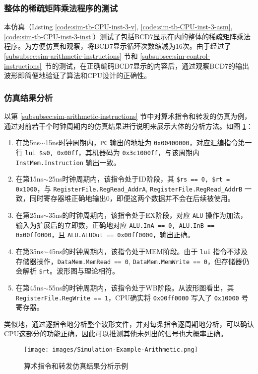 \subsubsection{整体的稀疏矩阵乘法程序的测试}
本仿真（Listing \ref{code:sim-tb-CPU-inst-3-v}, \ref{code:sim-tb-CPU-inst-3-asm}, \ref{code:sim-tb-CPU-inst-3-inst}）测试了包括BCD7显示在内的整体的稀疏矩阵乘法程序。为方便仿真和观察，将BCD7显示循环次数缩减为16次。由于经过了 \ref{subsubsec:sim-arithmetic-instructions} 节和 \ref{subsubsec:sim-control-instructions}\ 节的测试，在正确编码BCD7显示的内容后，通过观察BCD7的输出波形即简便地验证了算法和CPU设计的正确性。

\subsubsection{仿真结果分析}
以第 \ref{subsubsec:sim-arithmetic-instructions} 节中对算术指令和转发的仿真为例，通过对前若干个时钟周期内的仿真结果进行说明来展示大体的分析方法。如图 \ref{fig:sim-example-arithmetic}：
\begin{enumerate}
    \item 在第5ns$\sim$15ns时钟周期内，\lstinline|PC| 输出的地址为 \lstinline|0x00400000|，对应汇编指令第一行 \lstinline|lui $s0, 0x00ff|，其机器码为 \lstinline|0x3c1000ff|，与该周期内 \lstinline|InstMem.Instruction| 输出一致。
    \item 在第15ns$\sim$25ns时钟周期内，该指令处于ID阶段，其 \lstinline|$rs == 0, $rt = 0x1000|，与 \lstinline|RegisterFile.RegRead_AddrA|, \lstinline|RegisterFile.RegRead_AddrB| 一致，同时寄存器堆正确地输出0，即便这两个数据并不会在后续被使用。
    \item 在第25ns$\sim$35ns的时钟周期内，该指令处于EX阶段，对应 \lstinline|ALU| 操作为加法，输入为扩展后的立即数，正确地对应 \lstinline|ALU.InA == 0, ALU.InB == 0x00ff0000|，且 \lstinline|ALU.ALUOut == 0x00ff0000|，输出正确。
    \item 在第35ns$\sim$45ns的时钟周期内，该指令处于MEM阶段。由于 \lstinline|lui| 指令不涉及存储器操作，\lstinline|DataMem.MemRead == 0|, \lstinline|DataMem.MemWrite == 0|，但存储器仍会解析 \lstinline|$rt|。波形图与理论相符。
    \item 在第45ns$\sim$55ns的时钟周期内，该指令处于WB阶段。从波形图看出，其 \lstinline|RegisterFile.RegWrite == 1|，CPU确实将 \lstinline|0x00ff0000| 写入了 \lstinline|0x10000| 号寄存器。
\end{enumerate}
类似地，通过逐指令地分析整个波形文件，并对每条指令逐周期地分析，可以确认CPU这部分的功能正确，因此可以推测其他未列出的信号也大概率正确。
\begin{figure}[H]
    \centering
    \texttt{[image: images/Simulation-Example-Arithmetic.png]}
    \caption{算术指令和转发仿真结果分析示例}
    \label{fig:sim-example-arithmetic}
\end{figure}



